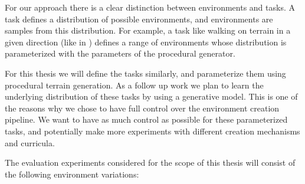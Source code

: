 For our approach there is a clear distinction between environments and tasks. A task
defines a distribution of possible environments, and environments are samples from
this distribution. For example, a task like walking on terrain in a given direction 
(like in \cite{DeepTerrainRL}) defines a range of environments whose distribution
is parameterized with the parameters of the procedural generator.

For this thesis we will define the tasks similarly, and parameterize them using
procedural terrain generation. As a follow up work we plan to learn the underlying 
distribution of these tasks by using a generative model. This is one of the reasons
why we chose to have full control over the environment creation pipeline. We want
to have as much control as possible for these parameterized tasks, and potentially
make more experiments with different creation mechanisms and curricula.

The evaluation experiments considered for the scope of this thesis will consist of
the following environment variations:

